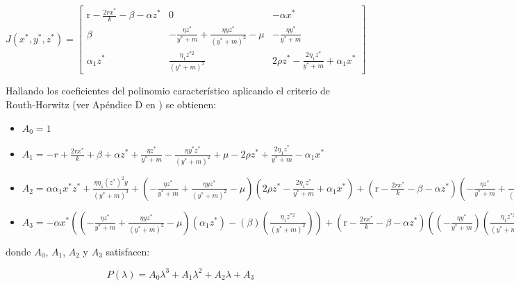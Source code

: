 \documentclass{wscpaperproc}
\theoremstyle{wsc}
\begin{document}
\begin{equation} \label{CharacteristicPolynomial}
	J\left(x^*, y^*, z^*\right)=\left[\begin{array}{ccc}
			\mathrm{r}-\frac{2 r x^*}{k}-\beta-\alpha z^* & 0                                                                   & -\alpha x^*                                     \\
			\beta                                         & -\frac{\eta z^*}{y^*+m}+\frac{\eta y z^*}{\left(y^*+m\right)^2}-\mu & -\frac{\eta y^*}{y^*+m}                         \\
			\alpha_1 z^*                                  & \frac{\eta_1 z^{* 2}}{\left(y^*+m\right)^2}                         & 2 \rho z^*-\frac{2 \eta_1 z^*}{y^*+m}+\alpha_1 x^*
		\end{array}\right]
\end{equation}

Hallando los coeficientes del polinomio característico aplicando el criterio de Routh-Horwitz (ver Apéndice D en \cite{castellanos_existence_2017}) se obtienen:


\begin{itemize}
	\item[] $A_0 = 1$

	\item[] $A_1 = -r + \frac{2rx^*}{k} + \beta + \alpha z^*  + \frac{\eta z^*}{y^*+m} - \frac{\eta y^*z^*}{(y^*+m)^2} + \mu - 2 \rho z^* + \frac{2\eta_1 z^*}{y^*+m} - \alpha_1 x^*$

	\item[] $A_2 = \alpha \alpha_1 x^* z^* + \frac{\eta \eta_1 (z^*)^{2} y}{(y^*+m)^3} + (-\frac{\eta z^*}{y^*+m}+\frac{\eta y z^*}{(y^*+m)^2}-\mu )(2 \rho z^*-\frac{2 \eta_1 z^*}{y^*+m}+\alpha_1 x^*) + (\mathrm{r}-\frac{2 r x^*}{k}-\beta-\alpha z^*)(-\frac{\eta z^*}{y^*+m}+\frac{\eta y z^*}{(y^*+m)^2}-\mu )(2 \rho z^*-\frac{2 \eta_1 z^*}{y^*+m}+\alpha_1 x^*)$

	\item[] $A_3 = -\alpha x^* ((-\frac{\eta z^*}{y^*+m}+\frac{\eta y z^*}{(y^*+m)^2}-\mu)(\alpha_1 z^* ) - (\beta) (\frac{\eta_1 z^{* 2}}{(y^*+m)^2}) ) + (\mathrm{r}-\frac{2 r x^*}{k}-\beta-\alpha z^*) ((-\frac{\eta y^*}{y^*+m} )(\frac{\eta_1 z^{* 2}}{(y^*+m)^2}) - (-\frac{\eta z^*}{y^*+m}+\frac{\eta y z^*}{(y^*+m)^2}-\mu)(2 \rho z^*-\frac{2 \eta_1 z^*}{y^*+m}+\alpha_1 x^*))	$
	
\end{itemize}
donde $A_0$, $A_1$, $A_2$  y $A_3$ satisfacen:

$$P(\lambda) = A_0\lambda^3 + A_1\lambda^2 + A_2\lambda + A_3$$
\end{document}
